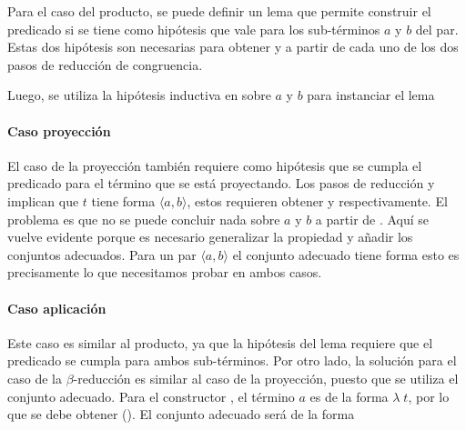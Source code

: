 Para el caso del producto, se puede definir un lema que permite construir el predicado si se tiene como hipótesis que \snstar vale para los sub-términos $a$ y $b$ del par.
Estas dos hipótesis son necesarias para obtener \snstar {} y \snstar {} a partir de cada uno de los dos pasos de reducción de congruencia.


Luego, se utiliza la hipótesis inductiva en  sobre $a$ y $b$ para instanciar el lema


\paragraph{Caso proyección}

El caso de la proyección también requiere como hipótesis que se cumpla el predicado para el término que se está proyectando.
Los pasos de reducción  y  implican que $t$ tiene forma $\langle a, b \rangle$, estos requieren obtener \snstar {} y \snstar {} respectivamente.
El problema es que no se puede concluir nada sobre $a$ y $b$ a partir de .
Aquí se vuelve evidente porque es necesario generalizar la propiedad  y añadir los conjuntos adecuados.
Para un par $\langle a, b \rangle$ el conjunto adecuado tiene forma
\snstar{}  \snstar{}
esto es precisamente lo que necesitamos probar en ambos casos.


\paragraph{Caso aplicación}

Este caso es similar al producto, ya que la hipótesis del lema requiere que el predicado se cumpla para ambos sub-términos.
Por otro lado, la solución para el caso de la $\beta$-reducción es similar al caso de la proyección, puesto que se utiliza el conjunto adecuado.
Para el constructor , el término $a$ es de la forma $\lambda\; t$, por lo que se debe obtener
\snstar(\func{[}\func{]}).
El conjunto adecuado 
será de la forma
\snstar{}
\snstar{}

